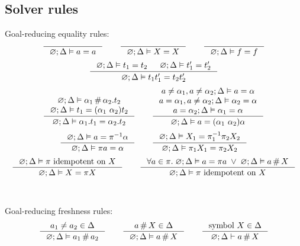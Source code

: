\documentclass[english, mgr]{iithesis}
\newcommand{\solverRule}{\vdash}
\begin{document}

\printbibliography

\begin{appendices}
\chapter{Solver rules}
Goal-reducing equality rules:
$$\inference{
}{
  \emptyenv ; \icEnv \vDash \atomv = \atomv
}
\qquad
\inference{
}{
  \emptyenv ; \icEnv \vDash \termv = \termv
}
\qquad
\inference{
}{
  \emptyenv ; \icEnv \vDash \symb = \symb
}
$$
$$
\inference{
  \emptyenv ; \icEnv \vDash \term_1 = \term_2
  &
  \emptyenv ; \icEnv \vDash \term_1' = \term_2'
}{
  \emptyenv ; \icEnv \vDash \term_1 \term_1' = \term_2 \term_2'
}
$$
$$
\inference{
  \emptyenv ; \icEnv \vDash \atomexp_1 \cfresh \tbind{\atomexp_2}\term_2
  \\
  \emptyenv ; \icEnv \vDash \term_1 = \permswap{\atomexp_1}{\atomexp_2} \term_2
}{
  \emptyenv ; \icEnv \vDash \tbind{\atomexp_1} \term_1 = \tbind{\atomexp_2} \term_2
}
\qquad
\inference{
  \atomv \cneq \atomexp_1, \atomv \cneq \atomexp_2; \icEnv \vDash \atomv     = \atomexp \\
  \atomv \ceq  \atomexp_1, \atomv \cneq \atomexp_2; \icEnv \vDash \atomexp_2 = \atomexp \\
  \atomv \ceq  \atomexp_2; \icEnv \vDash \atomexp_1 = \atomexp
}{
  \emptyenv; \icEnv \vDash \atomv = \permswap{\atomexp_1}{\atomexp_2}{\atomexp}
}
$$
$$
\inference{
  \emptyenv; \icEnv \vDash \atomv = \perm^{-1} \atomexp
}{
  \emptyenv; \icEnv \vDash \perm \atomv = \atomexp
}
\qquad
\inference{
  \emptyenv; \icEnv \vDash \termv_1 = \pi_1^{-1} \pi_2 \termv_2
}{
  \emptyenv; \icEnv \vDash \pi_1 \termv_1 = \pi_2 \termv_2
}
$$
$$
\inference{
  \emptyenv; \icEnv \vDash \pi \text{ idempotent on } \termv
}{
  \emptyenv; \icEnv \vDash \termv = \pi \termv
}
\qquad
\inference{
  \forall \atomv \in \pi.\;
    \emptyenv; \icEnv \vDash \atomv = \pi \atomv \;\vee\;
    \emptyenv; \icEnv \vDash \atomv \cfresh \termv
  }{
  \emptyenv; \icEnv \vDash \pi \text{ idempotent on } \termv
}
$$
\\
\\
Goal-reducing freshness rules:
$$\inference{
  \atomv_1 \cneq \atomv_2 \in \icEnv
}{
  \emptyenv; \icEnv \vDash \atomv_1 \cfresh \atomv_2
}
\qquad
\inference{
  \atomv \cfresh \termv \in \icEnv
}{
  \emptyenv; \icEnv \vDash \atomv \cfresh \termv
}
\qquad
\inference{
  \csymb \termv \in \icEnv
}{
  \emptyenv ; \icEnv \solverRule \atomv \cfresh \termv
}$$
\end{appendices}
\end{document}
